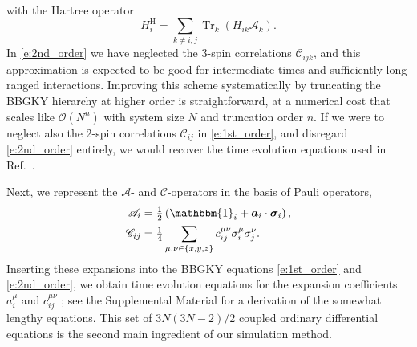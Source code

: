 \documentclass[aps,prl,showpacs,amsmath,amssymb,superscriptaddress,reprint,10pt]{revtex4-1}
\newcommand{\ar}[1]{{\color{analabha} #1}}
\newcommand\id{{\mathbbm{1}}}
\newcommand{\mvec}[1]{\boldsymbol #1}
\DeclareMathOperator{\Tr}{{Tr}}
\begin{document}
with the Hartree operator
\begin{equation}
 H_i^\text{H}=\sum_{k\neq i,j}\Tr_k\left(H_{ik} \mathscr{A}_k\right).
\end{equation}
In \eqref{e:2nd_order} we have neglected the 3-spin correlations $\mathscr{C}_{ijk}$, and this approximation is expected to be good for intermediate times and sufficiently long-ranged interactions. Improving this scheme systematically by truncating the BBGKY hierarchy at higher order is straightforward, at a numerical cost that scales like $\mathscr{O}\left(N^n\right)$ with system size $N$ and truncation order $n$. If we were to neglect also the 2-spin correlations $\mathscr{C}_{ij}$ in \eqref{e:1st_order}, and disregard \eqref{e:2nd_order} entirely, we would recover the time evolution equations used in Ref.~\cite{Schachenmayer_etal15}.

Next, we represent the $\mathscr{A}$- and $\mathscr{C}$-operators in the basis of Pauli operators,
\begin{subequations}
\begin{align}
\mathscr{A}_i &= \tfrac{1}{2}\left(\id_i+\mvec{a}_i\cdot\mvec{\sigma}_i\right),\label{e:Aexp}\\
\mathscr{C}_{ij} &= \tfrac{1}{4}\sum_{\mu,\nu\in\{x,y,z\}}c_{ij}^{\mu\nu}\sigma_i^\mu\sigma_j^\nu.\label{e:Cexp}
\end{align}
\end{subequations}
Inserting these expansions into the BBGKY equations \eqref{e:1st_order} and \eqref{e:2nd_order}, we obtain time evolution equations for the expansion coefficients $a_i^\mu$ and $c_{ij}^{\mu\nu}$ \cite{PaskauskasKastner12}; see the Supplemental Material for a derivation of the somewhat lengthy equations. \ar{This set of $3N(3N-2)/2$}\marginpar{\ar{\tiny{correct number is $3N(3N-1)/2$}}} coupled ordinary differential equations is the second main ingredient of our simulation method.
\end{document}
